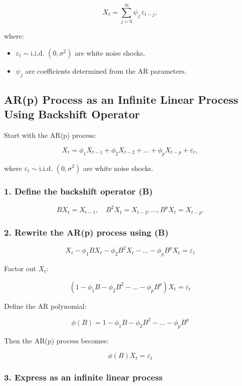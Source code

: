 \documentclass[
  11pt,
  a4paper,
]{report}
\begin{document}
\[X_t = \sum_{j=0}^{\infty} \psi_j \, \varepsilon_{t-j},\]

where:

\begin{itemize}
\item
  \(\varepsilon_t \sim \text{i.i.d. }(0, \sigma^2)\) are white noise
  shocks,
\item
  \(\psi_j\) are coefficients determined from the AR parameters.
\end{itemize}

\subsection{AR(p) Process as an Infinite Linear Process Using Backshift
Operator}\label{arp-process-as-an-infinite-linear-process-using-backshift-operator}

Start with the AR(p) process:

\[X_t = \phi_1 X_{t-1} + \phi_2 X_{t-2} + \dots + \phi_p X_{t-p} + \varepsilon_t,\]

where \(\varepsilon_t \sim \text{i.i.d. }(0, \sigma^2)\) are white noise
shocks.

\subsubsection{1. Define the backshift operator
(B)}\label{define-the-backshift-operator-b}

\[B X_t = X_{t-1}, \quad B^2 X_t = X_{t-2}, \dots, B^p X_t = X_{t-p}.\]

\subsubsection{2. Rewrite the AR(p) process using
(B)}\label{rewrite-the-arp-process-using-b}

\[X_t - \phi_1 B X_t - \phi_2 B^2 X_t - \dots - \phi_p B^p X_t = \varepsilon_t\]

Factor out \(X_t\):

\[(1 - \phi_1 B - \phi_2 B^2 - \dots - \phi_p B^p) X_t = \varepsilon_t\]

Define the AR polynomial:

\[\phi(B) = 1 - \phi_1 B - \phi_2 B^2 - \dots - \phi_p B^p\]

Then the AR(p) process becomes:

\[\phi(B) X_t = \varepsilon_t\]

\subsubsection{3. Express as an infinite linear
process}\label{express-as-an-infinite-linear-process}
\end{document}
